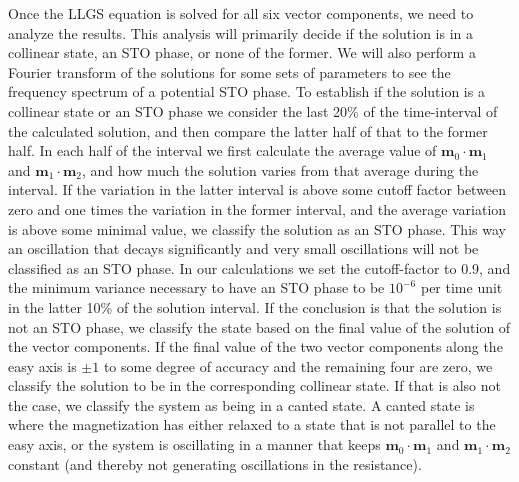 Once the LLGS equation is solved for all six vector components, we need to analyze the results. This analysis will primarily decide if the solution is in a collinear state, an STO phase, or none of the former. We will also perform a Fourier transform of the solutions for some sets of parameters to see the frequency spectrum of a potential STO phase. To establish if the solution is a collinear state or an STO phase we consider the last 20\% of the time-interval of the calculated solution, and then compare the latter half of that to the former half. In each half of the interval we first calculate the average value of $\mathbold{m}_0\cdot\mathbold{m}_1$ and $\mathbold{m}_1\cdot\mathbold{m}_2$, and how much the solution varies from that average during the interval. If the variation in the latter interval is above some cutoff factor between zero and one times the variation in the former interval, and the average variation is above some minimal value, we classify the solution as an STO phase. This way an oscillation that decays significantly and very small oscillations will not be classified as an STO phase. In our calculations we set the cutoff-factor to 0.9, and the minimum variance necessary to have an STO phase to be $10^{-6}$ per time unit in the latter 10\% of the solution interval. If the conclusion is that the solution is not an STO phase, we classify the state based on the final value of the solution of the vector components. If the final value of the two vector components along the easy axis is $\pm1$ to some degree of accuracy and the remaining four are zero, we classify the solution to be in the corresponding collinear state. If that is also not the case, we classify the system as being in a canted state. A canted state is where the magnetization has either relaxed to a state that is not parallel to the easy axis, or the system is oscillating in a manner that keeps $\mathbold{m}_0\cdot\mathbold{m}_1$ and $\mathbold{m}_1\cdot\mathbold{m}_2$ constant (and thereby not generating oscillations in the resistance). 
